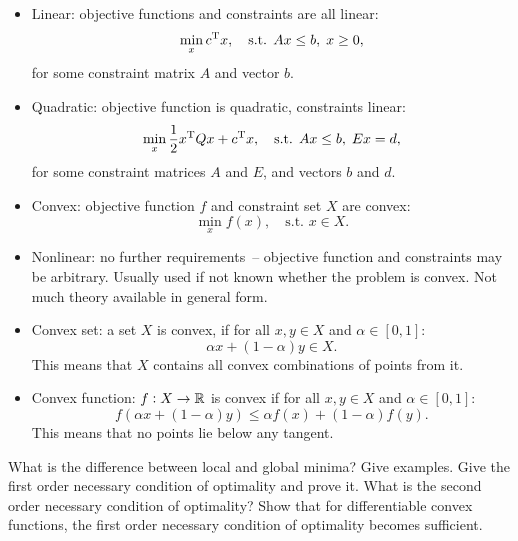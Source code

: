 \documentclass{article}
\begin{document}
\begin{itemize}
\item Linear: objective functions and constraints are all linear:
  \begin{equation*}
    \min_x c^{\mathrm{T}} x, \quad\text{s.t. } Ax \leq b,\; x \geq 0,
  \end{equation*}
  for some constraint matrix \(A\) and vector \(b\).
\item Quadratic: objective function is quadratic, constraints linear:
  \begin{equation*}
    \min_x \frac{1}{2}x^{\mathrm{T}} Q x + c^{\mathrm{T}} x, \quad\text{s.t. } Ax \leq b, \; Ex = d,
  \end{equation*}
  for some constraint matrices \(A\) and \(E\), and vectors \(b\) and \(d\).
\item Convex: objective function \(f\) and constraint set \(X\) are convex:
  \begin{equation*}
    \min_x f(x), \quad\text{s.t. } x \in X.
  \end{equation*}
\item Nonlinear: no further requirements~-- objective function and constraints may be
  arbitrary.  Usually used if not known whether the problem is convex.  Not much theory available in
  general form.
\item Convex set: a set \(X\) is convex, if for all \(x, y \in X\) and
  \(\alpha \in [0,1]\):
  \begin{equation*}
    \alpha x + (1 - \alpha) y \in X.
  \end{equation*}
  This means that \(X\) contains all convex combinations of points from it.
\item Convex function: \(f: X \to \mathbb{R}\) is convex if for all \(x, y \in X\) and
  \(\alpha \in [0,1]\):
  \begin{equation*}
    f(\alpha x + (1 - \alpha) y) \leq \alpha f(x) + (1 - \alpha) f(y).
  \end{equation*}
  This means that no points lie below any tangent.
\end{itemize}

\begin{question}
  What is the difference between local and global minima?  Give examples.  Give the first order
  necessary condition of optimality and prove it. What is the second order necessary condition of
  optimality? Show that for differentiable convex functions, the first order necessary condition of
  optimality becomes sufficient.
\end{question}
\end{document}
